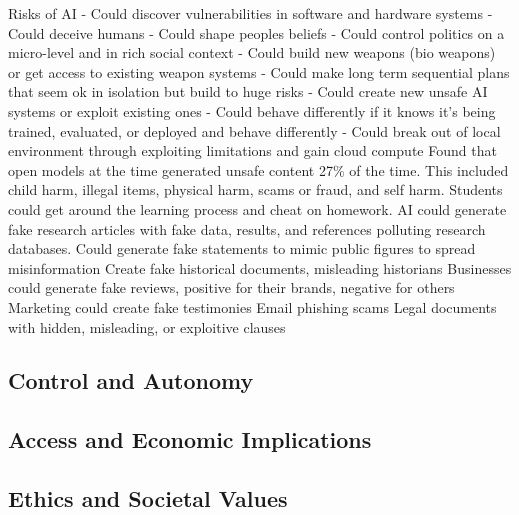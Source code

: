 \citep{shevlane_model_2023}
Risks of AI
- Could discover vulnerabilities in software and hardware systems
- Could deceive humans 
- Could shape peoples beliefs
- Could control politics on a micro-level and in rich social context
- Could build new weapons (bio weapons) or get access to existing weapon systems
- Could make long term sequential plans that seem ok in isolation but build to huge risks
- Could create new unsafe AI systems or exploit existing ones
- Could behave differently if it knows it's being trained, evaluated, or deployed and behave differently
- Could break out of local environment through exploiting limitations and gain cloud compute
\citep{vidgen_simplesafetytests_2024}
Found that open models at the time generated unsafe content 27\% of the time. This included child harm, illegal items, physical harm, scams or fraud, and self harm.
\citep{ferrara_genai_2024}
Students could get around the learning process and cheat on homework. 
AI could generate fake research articles with fake data, results, and references polluting research databases.
Could generate fake statements to mimic public figures to spread misinformation
Create fake historical documents, misleading historians
Businesses could generate fake reviews, positive for their brands, negative for others
Marketing could create fake testimonies
Email phishing scams
Legal documents with hidden, misleading, or exploitive clauses


\subsection{Control and Autonomy}

\subsection{Access and Economic Implications}

\subsection{Ethics and Societal Values}
